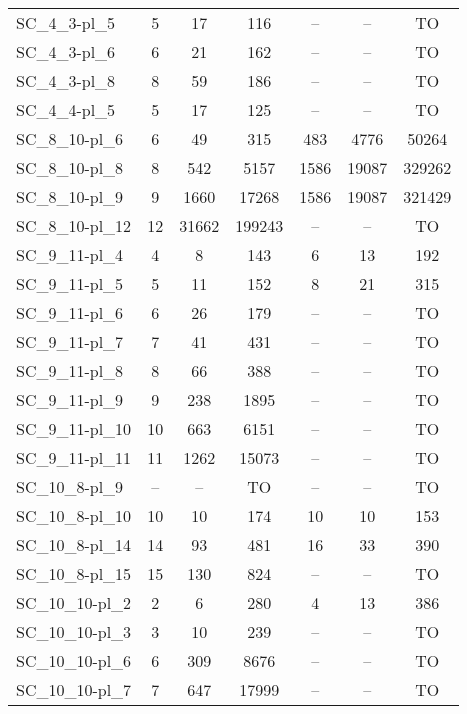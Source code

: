 \documentclass{article}
\newcommand{\unsolvedColumn}{--}
\newcommand{\myTO}{TO}
\begin{document}
\begin{longtable}[!ht]{l|ccc|ccc}
SC\_4\_3-pl\_5 & 5 & 17 & 116 & \unsolvedColumn & \unsolvedColumn & \myTO \\
SC\_4\_3-pl\_6 & 6 & 21 & 162 & \unsolvedColumn & \unsolvedColumn & \myTO \\
SC\_4\_3-pl\_8 & 8 & 59 & 186 & \unsolvedColumn & \unsolvedColumn & \myTO \\
SC\_4\_4-pl\_5 & 5 & 17 & 125 & \unsolvedColumn & \unsolvedColumn & \myTO \\
SC\_8\_10-pl\_6 & 6 & 49 & 315 & 483 & 4776 & 50264 \\
SC\_8\_10-pl\_8 & 8 & 542 & 5157 & 1586 & 19087 & 329262 \\
SC\_8\_10-pl\_9 & 9 & 1660 & 17268 & 1586 & 19087 & 321429 \\
SC\_8\_10-pl\_12 & 12 & 31662 & 199243 & \unsolvedColumn & \unsolvedColumn & \myTO \\
SC\_9\_11-pl\_4 & 4 & 8 & 143 & 6 & 13 & 192 \\
SC\_9\_11-pl\_5 & 5 & 11 & 152 & 8 & 21 & 315 \\
SC\_9\_11-pl\_6 & 6 & 26 & 179 & \unsolvedColumn & \unsolvedColumn & \myTO \\
SC\_9\_11-pl\_7 & 7 & 41 & 431 & \unsolvedColumn & \unsolvedColumn & \myTO \\
SC\_9\_11-pl\_8 & 8 & 66 & 388 & \unsolvedColumn & \unsolvedColumn & \myTO \\
SC\_9\_11-pl\_9 & 9 & 238 & 1895 & \unsolvedColumn & \unsolvedColumn & \myTO \\
SC\_9\_11-pl\_10 & 10 & 663 & 6151 & \unsolvedColumn & \unsolvedColumn & \myTO \\
SC\_9\_11-pl\_11 & 11 & 1262 & 15073 & \unsolvedColumn & \unsolvedColumn & \myTO \\
SC\_10\_8-pl\_9 & \unsolvedColumn & \unsolvedColumn & \myTO & \unsolvedColumn & \unsolvedColumn & \myTO \\
SC\_10\_8-pl\_10 & 10 & 10 & 174 & 10 & 10 & 153 \\
SC\_10\_8-pl\_14 & 14 & 93 & 481 & 16 & 33 & 390 \\
SC\_10\_8-pl\_15 & 15 & 130 & 824 & \unsolvedColumn & \unsolvedColumn & \myTO \\
SC\_10\_10-pl\_2 & 2 & 6 & 280 & 4 & 13 & 386 \\
SC\_10\_10-pl\_3 & 3 & 10 & 239 & \unsolvedColumn & \unsolvedColumn & \myTO \\
SC\_10\_10-pl\_6 & 6 & 309 & 8676 & \unsolvedColumn & \unsolvedColumn & \myTO \\
SC\_10\_10-pl\_7 & 7 & 647 & 17999 & \unsolvedColumn & \unsolvedColumn & \myTO \\

\end{longtable}
\end{document}
